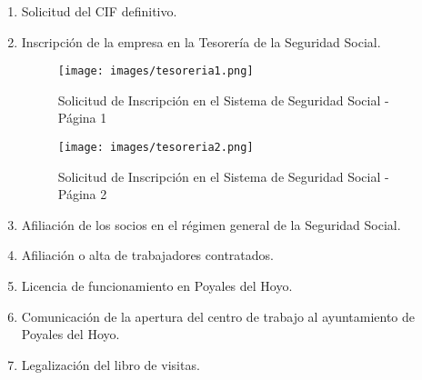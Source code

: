 \begin{enumerate}
\newpage
\item Solicitud del CIF definitivo.
\item Inscripción de la empresa en la Tesorería de la Seguridad Social.

\begin{figure}[h!]
  \begin{center}
    \texttt{[image: images/tesoreria1.png]}
    \caption{Solicitud de Inscripción en el Sistema de Seguridad Social - Página 1}
    \label{fig:tesoreria1}
  \end{center}
\end{figure}

\begin{figure}[p!]
  \begin{center}
    \texttt{[image: images/tesoreria2.png]}
    \caption{Solicitud de Inscripción en el Sistema de Seguridad Social - Página 2}
    \label{fig:tesoreria2}
  \end{center}
\end{figure}

\newpage
\item Afiliación de los socios en el régimen general de la Seguridad Social.
\item Afiliación o alta de trabajadores contratados.
\item Licencia de funcionamiento en Poyales del Hoyo.
\item Comunicación de la apertura del centro de trabajo al ayuntamiento de Poyales del Hoyo.
\item Legalización del libro de visitas.

\end{enumerate}
